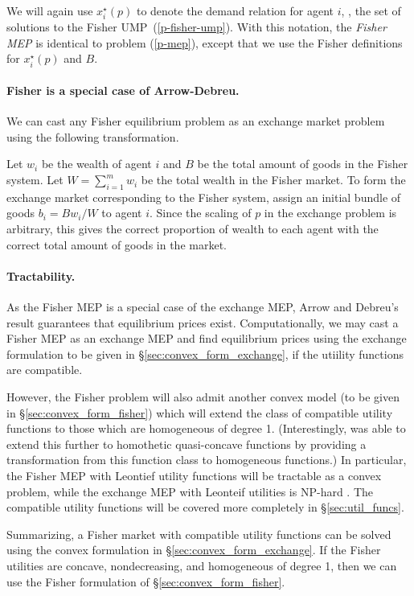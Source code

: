 \documentclass[12pt]{article}
\begin{document}
We will again use $x^\star_i(p)$ to denote the demand relation for agent $i$,
\ie, the set of solutions to the Fisher UMP~(\ref{p-fisher-ump}). With this
notation, the \emph{Fisher MEP} is identical to problem (\ref{p-mep}),
except that we use the Fisher definitions for $x^\star_i(p)$ and $B$.


\paragraph{Fisher is a special case of Arrow-Debreu.}

We can cast any Fisher equilibrium problem as an exchange market problem using
the following transformation.

Let $w_i$ be the wealth of agent $i$ and $B$ be the total amount of goods in
the Fisher system. Let $W = \sum_{i=1}^m w_i$ be the total wealth in the Fisher
market. To form the exchange market corresponding to the Fisher system, assign
an initial bundle of goods $b_i = B w_i/W$ to agent $i$. Since the scaling of
$p$ in the exchange problem is arbitrary, this gives the correct proportion of
wealth to each agent with the correct total amount of goods in the market.


\paragraph{Tractability.}

As the Fisher MEP is a special case of the exchange MEP, Arrow and Debreu's
result guarantees that equilibrium prices exist.
Computationally, we may cast a Fisher MEP as an exchange MEP and find equilibrium
prices using the exchange formulation to be given in
\S\ref{sec:convex_form_exchange}, if the utiility functions are compatible.

However, the Fisher problem will also admit another convex model (to be
given in \S\ref{sec:convex_form_fisher}) which will extend the class of
compatible utility functions to those which are homogeneous of degree 1.
(Interestingly, \cite{jain2005market} was able to extend this further
to homothetic quasi-concave functions by providing a transformation
from this function class to homogeneous functions.)
In particular, the Fisher MEP with Leontief utility functions will be tractable
as a convex problem, while the exchange MEP with Leonteif utilities is NP-hard
\cite{codenotti2006leontief}. The compatible utility functions will be covered
more completely in \S\ref{sec:util_funcs}.

Summarizing, a Fisher market with compatible utility functions can be solved
using the convex formulation in \S\ref{sec:convex_form_exchange}. If the Fisher
utilities are concave, nondecreasing, and homogeneous of degree 1, then we can
use the Fisher formulation of \S\ref{sec:convex_form_fisher}.
\end{document}
